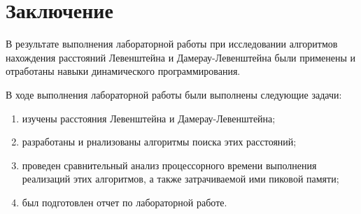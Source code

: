 \chapter*{Заключение}

В результате выполнения лабораторной работы при исследовании алгоритмов нахождения расстояний Левенштейна и Дамерау-Левенштейна были применены и отработаны навыки динамического программирования.

В ходе выполнения лабораторной работы были выполнены следующие задачи: 
\begin{enumerate}[label={\arabic*)}]
	\item изучены расстояния Левенштейна и Дамерау-Левенштейна;
	\item разработаны и рнализованы алгоритмы поиска этих расстояний;
	\item проведен сравнительный анализ процессорного времени выполнения реализаций этих алгоритмов, а также затрачиваемой ими пиковой памяти;
	\item был подготовлен отчет по лабораторной работе.
\end{enumerate}

